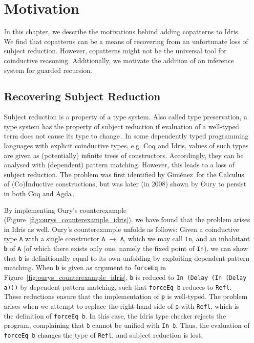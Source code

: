 
\chapter{Motivation}
In this chapter, we describe the motivations behind adding copatterns to
Idris. We find that copatterns can be a means of recovering from an unfortunate
loss of subject reduction. However, copatterns might not be the universal tool
for coinductive reasoning. Additionally, we motivate the addition of an
inference system for guarded recursion.

\section{Recovering Subject Reduction}
\label{sec:recov-subj-reduct}

Subject reduction is a property of a type system. Also called type preservation,
a type system has the property of subject reduction if evaluation of a
well-typed term does not cause its type to change\,\citep[Section~8.3.3]{Pierce:2002:TPL:509043}.
In some dependently typed programming languages with explicit coinductive types,
e.g. Coq and Idris, values of such types are given as (potentially) infinite
trees of constructors. Accordingly, they can be analysed with (dependent)
pattern matching. However, this leads to a loss of subject reduction. The
problem was first identified by Gim\'{e}nez\,\citep{Gimenez96uncalcul} for the
Calculus of (Co)Inductive constructions, but was later (in 2008) shown by Oury
to persist in both Coq and
Agda\,\citep{OuryCounterexampleCoq,OuryCounterexampleAgda}.

By implementing Oury's counterexample
(Figure~\ref{fig:ourys_counterexample_idris}), we have found that the problem
arises in Idris as well. Oury's counterexample unfolds as follows: Given a
coinductive type \texttt{A} with a single constructor \texttt{A} $\to$ \texttt{A}, which we may call
\texttt{In}, and an inhabitant \texttt{b} of \texttt{A} (of which there exists only one,
namely the fixed point of \texttt{In}), we can show that \texttt{b} is definitionally
equal to its own unfolding by exploiting dependent pattern matching. When
\texttt{b} is given as argument to \texttt{forceEq} in
Figure~\ref{fig:ourys_counterexample_idris}, \texttt{b} is reduced to \texttt{In
  (Delay (In (Delay a)))} by dependent pattern matching, such that \texttt{forceEq b}
reduces to \texttt{Refl}. These reductions ensure that the implementation of
\texttt{p} is well-typed. The problem arises when we attempt to replace the
right-hand side of \texttt{p} with \texttt{Refl}, which is the definition of
\texttt{forceEq b}. In this case, the Idris type checker rejects the program,
complaining that \texttt{b} cannot be unified with \texttt{In b}. Thus, the
evaluation of \texttt{forceEq b} changes the type of \texttt{Refl}, and subject
reduction is lost.

